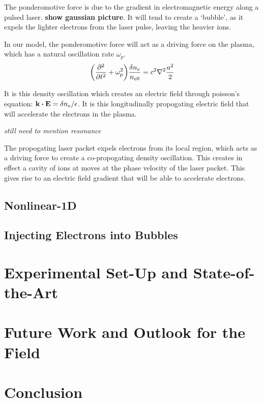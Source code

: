 \documentclass[12pt, titlepage]{article}
\begin{document}
The ponderomotive force is due to the gradient in electromagnetic energy along a pulsed laser. {\bf show gaussian picture}. It will tend to create a `bubble', as it expels the lighter electrons from the laser pulse, leaving the heavier ions.

In our model, the ponderomotive force will act as a driving force on the plasma,
which has a natural oscillation rate $\omega_p$. 
\begin{equation}
    \label{eq:linear density oscillation}
    \qty(\pdv[2]{}{t} +\omega_p^2) \frac{\delta n_e}{n_{e0}} = c^2 \laplacian{ \frac{a^2}{2}}
\end{equation}

It is this density oscillation which creates an electric field through poisson's equation: $\vb{k}\dotproduct\vb{E} =\delta n_e/\epsilon$. It is this
longitudinally propogating electric field that will accelerate the electrons in the plasma.
 
{\it still need to mention resonance}

The propogating laser packet expels electrons from its local region, which acts
as a driving force to create a co-propogating density oscillation. This creates in effect a cavity of ions at moves at the phase velocity of the laser packet. 
This gives rise to an electric field gradient that will be able to accelerate electrons.

\subsection{Nonlinear-1D}

\subsection{Injecting Electrons into Bubbles}

\section{Experimental Set-Up and State-of-the-Art}

\section{Future Work and Outlook for the Field}

\section{Conclusion}
\end{document}
